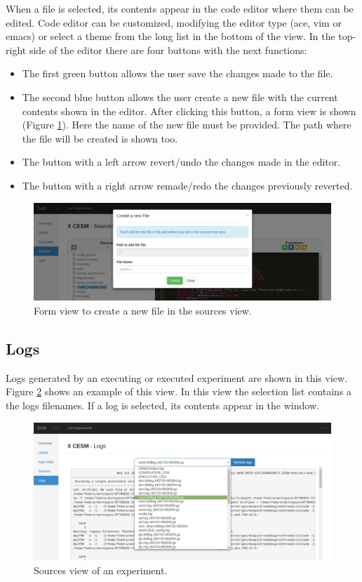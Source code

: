\documentclass[11pt]{article}
\begin{document}
When a file is selected, its contents appear in the code editor where them can be edited. Code editor can be customized, modifying the editor type (ace, vim or emacs) or select a theme from the long list in the bottom of the view. In the top-right side of the editor there are four buttons with the next functions:
\begin{itemize}
	\item The first green button allows the user save the changes made to the file.
	\item The second blue button allows the user create a new file with the current contents shown in the editor. After clicking this button, a form view is shown (Figure \ref{fig:sources-new-file}). Here the name of the new file must be provided. The path where the file will be created is shown too.
	\item The button with a left arrow revert/undo the changes made in the editor.
	\item The button with a right arrow remade/redo the changes previously reverted.
\end{itemize}
\begin{figure}[htp]
	\centering
	\includegraphics[width=\linewidth]{img/sources-new-file}
	\caption{Form view to create a new file in the sources view.}
	\label{fig:sources-new-file}
\end{figure}

\subsection{Logs}\label{sec:logs}
Logs generated by an executing or executed experiment are shown in this view. Figure \ref{fig:logs-listed} shows an example of this view. In this view the selection list contains a the logs filenames. If a log is selected, its contents appear in the window.
\begin{figure}[htp]
	\centering
	\includegraphics[width=\linewidth]{img/logs-listed}
	\caption{Sources view of an experiment.}
	\label{fig:logs-listed}
\end{figure}
\end{document}
